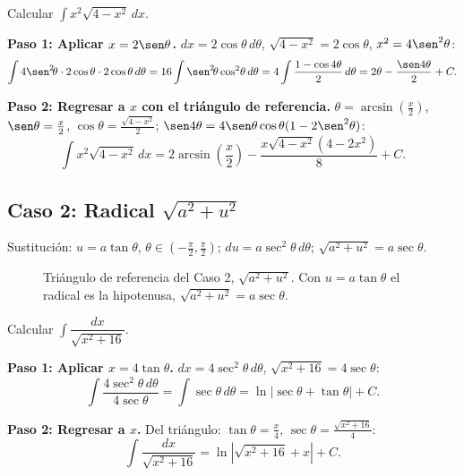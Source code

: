 \begin{example}
Calcular $\displaystyle\int x^2\sqrt{4-x^2}\,dx$.

\begin{myproof}

\textbf{Paso 1: Aplicar $x=2\sen\theta$.}
$dx=2\cos\theta\,d\theta$, $\sqrt{4-x^2}=2\cos\theta$, $x^2=4\sen^2\theta$:
\[
\int 4\sen^2\!\theta\cdot 2\cos\theta\cdot 2\cos\theta\,d\theta
= 16\int\sen^2\!\theta\cos^2\!\theta\,d\theta
= 4\int\frac{1-\cos 4\theta}{2}\,d\theta
= 2\theta - \frac{\sen 4\theta}{2}+C.
\]

\textbf{Paso 2: Regresar a $x$ con el triángulo de referencia.}
$\theta=\arcsin\!\left(\frac{x}{2}\right)$, $\sen\theta=\frac{x}{2}$, $\cos\theta=\frac{\sqrt{4-x^2}}{2}$; $\sen 4\theta=4\sen\theta\cos\theta(1-2\sen^2\theta)$:
\[
\boxed{\int x^2\sqrt{4-x^2}\,dx
= 2\arcsin\!\left(\frac{x}{2}\right)
- \frac{x\sqrt{4-x^2}(4-2x^2)}{8}+C.}
\]
\end{myproof}
\end{example}

\subsection{Caso 2: Radical $\sqrt{a^2+u^2}$}

Sustitución: $u=a\tan\theta$, $\theta\in\left(-\frac{\pi}{2},
\frac{\pi}{2}\right)$; $du=a\sec^2\theta\,d\theta$;
$\sqrt{a^2+u^2}=a\sec\theta$.

\begin{figure}[!htbp]
\centering
{}
\caption{Triángulo de referencia del Caso 2, $\sqrt{a^2+u^2}$. Con $u=a\tan\theta$ el radical es la hipotenusa, $\sqrt{a^2+u^2}=a\sec\theta$.}
\label{fig:triangulo_caso2}
\end{figure}

\begin{example}
Calcular $\displaystyle\int\dfrac{dx}{\sqrt{x^2+16}}$.

\begin{myproof}

\textbf{Paso 1: Aplicar $x=4\tan\theta$.}
$dx=4\sec^2\theta\,d\theta$, $\sqrt{x^2+16}=4\sec\theta$:
\[
\int\frac{4\sec^2\theta\,d\theta}{4\sec\theta}=\int\sec\theta\,d\theta
=\ln|\sec\theta+\tan\theta|+C.
\]

\textbf{Paso 2: Regresar a $x$.}
Del triángulo: $\tan\theta=\frac{x}{4}$, $\sec\theta=\frac{\sqrt{x^2+16}}{4}$:
\[
\boxed{\int\frac{dx}{\sqrt{x^2+16}}=\ln\left|\sqrt{x^2+16}+x\right|+C.}
\]
\end{myproof}
\end{example}

